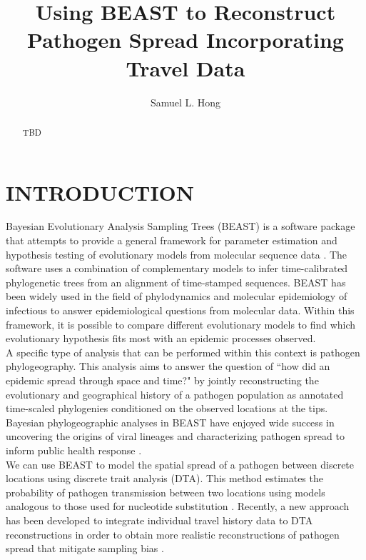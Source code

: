 \documentclass{article}
\title{Using BEAST to Reconstruct Pathogen Spread Incorporating Travel Data}
\author{Samuel L. Hong}
\begin{document}
\maketitle

\begin{abstract}
\begin{adjustwidth}{0.5cm}{0.5cm}
TBD 
\end{adjustwidth}
\end{abstract}

\section*{INTRODUCTION}

Bayesian Evolutionary Analysis Sampling Trees (BEAST) is a software package \cite{beast110} that attempts to provide a general framework for parameter estimation and hypothesis testing of evolutionary models from molecular sequence data \cite{beastOG,beast17,beast110}. The software uses a combination of complementary models to infer time-calibrated phylogenetic trees from an alignment of time-stamped sequences. BEAST has been widely used in the field of phylodynamics and molecular epidemiology of infectious to answer epidemiological questions from molecular data. Within this framework, it is possible to compare different evolutionary models to find which evolutionary hypothesis fits most with an epidemic processes observed. \\

A specific type of analysis that can be performed within this context is pathogen phylogeography. This analysis aims to answer the question of ``how did an epidemic spread through space and time?" by jointly reconstructing the evolutionary and geographical history of a pathogen population as annotated time-scaled phylogenies conditioned on the observed locations at the tips. Bayesian phylogeographic analyses in BEAST have enjoyed wide success in uncovering the origins of viral lineages \cite{hiv} and characterizing pathogen spread to inform public health response \cite{ebola}. \\

We can use BEAST to model the spatial spread of a pathogen between discrete locations using discrete trait analysis (DTA). This method estimates the probability of pathogen transmission between two locations using models analogous to those used for nucleotide substitution \cite{dta}. Recently, a new approach has been developed to integrate individual travel history data to DTA reconstructions in order to obtain more realistic reconstructions of pathogen spread that mitigate sampling bias \cite{travhist}. \\
\end{document}
